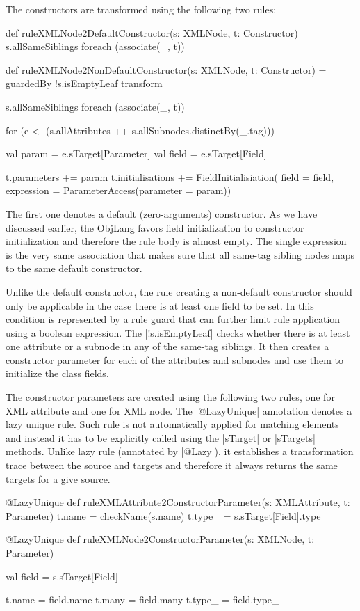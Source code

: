 The constructors are transformed using the following two rules:
%
\begin{scalacode}
def ruleXMLNode2DefaultConstructor(s: XMLNode, t: Constructor) {
  s.allSameSiblings foreach (associate(_, t))
}

def ruleXMLNode2NonDefaultConstructor(s: XMLNode, t: Constructor) = guardedBy {
  !s.isEmptyLeaf
} transform {

  s.allSameSiblings foreach (associate(_, t))

  for (e <- (s.allAttributes ++ s.allSubnodes.distinctBy(_.tag))) {
    val param = e.sTarget[Parameter]
    val field = e.sTarget[Field]

    t.parameters += param
    t.initialisations += FieldInitialisiation(
      field = field,
      expression = ParameterAccess(parameter = param))
  }
}
\end{scalacode}
%
The first one denotes a default (zero-arguments) constructor.
As we have discussed earlier, the ObjLang favors field initialization to constructor initialization and therefore the rule body is almost empty.
The single expression is the very same association that makes sure that all same-tag sibling nodes maps to the same default constructor.

Unlike the default constructor, the rule creating a non-default constructor should only be applicable in the case there is at least one field to be set.
In \SIGMA this condition is represented by a rule guard that can further limit rule application using a boolean expression.
The \Scala|!s.isEmptyLeaf| checks whether there is at least one attribute or a subnode in any of the same-tag siblings.
It then creates a constructor parameter for each of the attributes and subnodes and use them to initialize the class fields.

The constructor parameters are created using the following two rules, one for XML attribute and one for XML node.
The \Scala|@LazyUnique| annotation denotes a lazy unique rule.
Such rule is not automatically applied for matching elements and instead it has to be explicitly called using the \Scala|sTarget| or \Scala|sTargets| methods.
Unlike lazy rule (annotated by \Scala|@Lazy|), it establishes a transformation trace between the source and targets and therefore it always returns the same targets for a give source.
%
\begin{scalacode}
@LazyUnique
def ruleXMLAttribute2ConstructorParameter(s: XMLAttribute, t: Parameter) {
  t.name = checkName(s.name)
  t.type_ = s.sTarget[Field].type_
}

@LazyUnique
def ruleXMLNode2ConstructorParameter(s: XMLNode, t: Parameter) {
  val field = s.sTarget[Field]

  t.name = field.name
  t.many = field.many
  t.type_ = field.type_
}
\end{scalacode}

